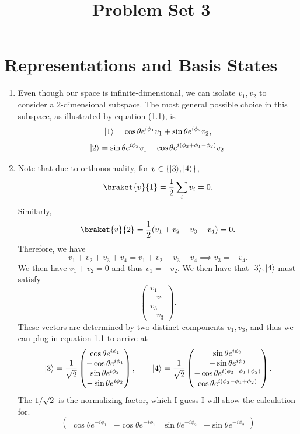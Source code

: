 \documentclass[11pt, letterpaper]{article}
\title{Problem Set 3}
\begin{document}
\makeproblem
\section{Representations and Basis States}
\begin{enumerate}
	\item Even though our space is infinite-dimensional, we can isolate $v_1,v_2$ to consider a 2-dimensional subspace. The most general possible choice in this subspace, as illustrated by equation (1.1), is
\[
	\lvert1\rangle=\cos \theta e^{i\phi_1} v_1+\sin \theta e^{i\phi_2} v_2,
\]
\[
	\lvert2\rangle=\sin \theta e^{i\phi_3} v_1-\cos \theta e^{i\left( \phi_3+\phi_1-\phi_2 \right) } v_2
.\]
\item Note that due to orthonormality, for $v\in\{\lvert3\rangle,\lvert4\rangle \} $,
		\[
			\braket{v}{1} =\frac{1}{2} \sum_{i} v_i=0
		.\]
		Similarly,
		\[
			\braket{v}{2} =\frac{1}{2}( v_1+v_2-v_3-v_4)=0
		.\]
		Therefore, we have
		\[
			v_1+v_2+v_3+v_4=v_1+v_2-v_3-v_4\implies v_3=-v_4
		.\]
		We then have $v_1+v_2=0$ and thus $v_1=-v_2$. We then have that $\lvert3\rangle , \lvert4\rangle $ must satisfy
		\[
			\begin{pmatrix}
			v_1 \\
			-v_1 \\
			v_3 \\
			-v_3
			\end{pmatrix}
		.\]
		These vectors are determined by two distinct components $v_1,v_3$, and thus we can plug in equation 1.1 to arrive at
		\[
			\lvert3\rangle =\frac{1}{\sqrt{2} } \begin{pmatrix}
			\cos \theta e^{i\phi_1}  \\
			-\cos \theta e^{i\phi _1}  \\
			\sin \theta e^{i\phi _2}  \\
			-\sin \theta e^{i\phi _2} 
			\end{pmatrix},\qquad \lvert4\rangle =\frac{1}{\sqrt{2} } \begin{pmatrix}
			\sin \theta e^{i\phi _3}  \\
			-\sin \theta e^{i\phi _3}  \\
			-\cos \theta e^{i\left( \phi _3-\phi _1+\phi _2 \right) }  \\
			\cos \theta e^{i\left( \phi _3-\phi _1+\phi _2 \right) } 
			\end{pmatrix}
		.\]
		The $1/\sqrt{2} $ is the normalizing factor, which I guess I will show the calculation for.
		\[
			\begin{pmatrix}
			\cos \theta e^{-i\phi _1}  & -\cos \theta e^{-i\phi _1}  & \sin \theta e^{-i\phi _2}  & -\sin \theta e^{-i\phi _2} 

\end{pmatrix}\]
\end{enumerate}
\end{document}
